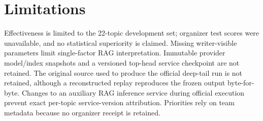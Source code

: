 \section{Limitations}
\label{sec:limitations}

Effectiveness is limited to the 22-topic development set; organizer test
scores were unavailable, and no statistical superiority is claimed.
Missing writer-visible parameters limit single-factor RAG interpretation.
Immutable provider model/index snapshots and a versioned top-head service
checkpoint are not retained. The original source used to produce the official deep-tail run is
not retained, although a reconstructed replay reproduces the frozen output
byte-for-byte. Changes to an auxiliary RAG inference service during
official execution prevent exact per-topic service-version attribution.
Priorities rely on team metadata because no organizer receipt is retained.
